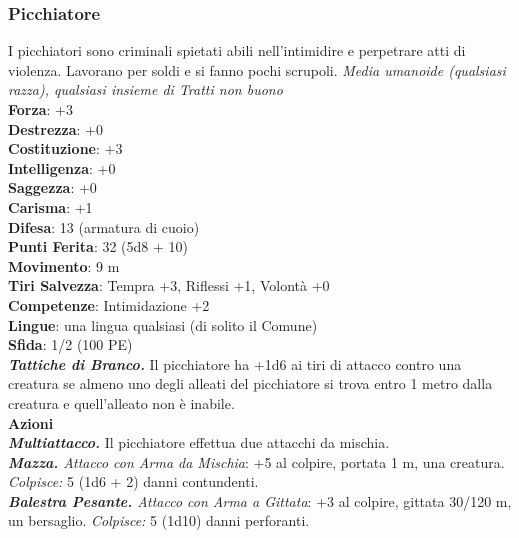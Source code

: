 \begin{multicols}{2}
\subsubsection{Picchiatore}
I picchiatori sono criminali spietati abili nell'intimidire e perpetrare atti di violenza. Lavorano per soldi e si fanno pochi scrupoli.
\emph{Media umanoide (qualsiasi razza), qualsiasi insieme di Tratti non buono}\\
\textbf{Forza}: +3\\
\textbf{Destrezza}: +0\\
\textbf{Costituzione}: +3\\
\textbf{Intelligenza}: +0\\
\textbf{Saggezza}: +0\\
\textbf{Carisma}: +1\\
\textbf{Difesa}: 13 (armatura di cuoio)\\
\textbf{Punti Ferita}: 32 (5d8 + 10)\\
\textbf{Movimento}: 9 m\\
\textbf{Tiri Salvezza}: Tempra +3, Riflessi +1, Volontà +0 \\
\textbf{Competenze}: Intimidazione +2\\
\textbf{Lingue}: una lingua qualsiasi (di solito il Comune)\\
\textbf{Sfida}: 1/2 (100 PE)\smallskip\\
\emph{\textbf{Tattiche di Branco.}} Il picchiatore ha +1d6 ai tiri di attacco contro una creatura se almeno uno degli alleati del picchiatore si trova entro 1 metro dalla creatura e quell'alleato non è inabile.\\
\smallskip\textbf{Azioni} \\
\emph{\textbf{Multiattacco.}} Il picchiatore effettua due attacchi da mischia.\\
\emph{\textbf{Mazza.} Attacco con Arma da Mischia}: +5 al colpire, portata 1 m, una creatura.\\
\emph{Colpisce:} 5 (1d6 + 2) danni contundenti.\\
\emph{\textbf{Balestra Pesante.} Attacco con Arma a Gittata}: +3 al colpire, gittata 30/120 m, un bersaglio. \emph{Colpisce:} 5 (1d10) danni perforanti.\\


\end{multicols}
